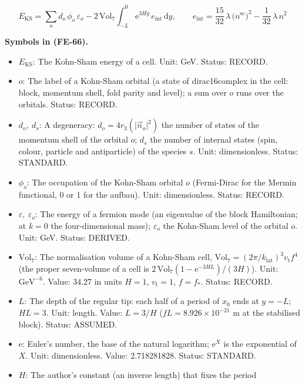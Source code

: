 \documentclass[
  10pt,
]{article}
\providecommand{\tightlist}{%
  \setlength{\itemsep}{0pt}\setlength{\parskip}{0pt}}
\begin{document}
\[
E_{\mathrm{KS}} = \sum_o d_o\,\phi_o\,\varepsilon_o -
 2\,\mathrm{Vol}_7\int_{-L}^{0}\mathrm{e}^{3Hy}\,e_{\mathrm{int}}\,\mathrm{d}y,
\qquad e_{\mathrm{int}} = \frac{15}{32}\,\lambda\,\big(n^{\mathrm{sc}}\big)^2 -
 \frac{1}{32}\,\lambda\,n^2 \tag{FE-66}
\]

\textbf{Symbols in (FE-66).}

\begin{itemize}
\tightlist
\item
  \(E_{\mathrm{KS}}\): The Kohn-Sham energy of a cell. Unit: GeV.
  Status: RECORD.
\item
  \(o\): The label of a Kohn-Sham orbital (a state of dirac16complex in
  the cell: block, momentum shell, fold parity and level); a sum over
  \(o\) runs over the orbitals. Status: RECORD.
\item
  \(d_o,\ d_s\): A degeneracy: \(d_o = 4r_3(\lvert\vec n_o\rvert^2)\)
  the number of states of the momentum shell of the orbital \(o\);
  \(d_s\) the number of internal states (spin, colour, particle and
  antiparticle) of the species \(s\). Unit: dimensionless. Status:
  STANDARD.
\item
  \(\phi_o\): The occupation of the Kohn-Sham orbital \(o\) (Fermi-Dirac
  for the Mermin functional, 0 or 1 for the aufbau). Unit:
  dimensionless. Status: RECORD.
\item
  \(\varepsilon,\ \varepsilon_o\): The energy of a fermion mode (an
  eigenvalue of the block Hamiltonian; at \(k = 0\) the four-dimensional
  mass); \(\varepsilon_o\) the Kohn-Sham level of the orbital \(o\).
  Unit: GeV. Status: DERIVED.
\item
  \(\mathrm{Vol}_7\): The normalisation volume of a Kohn-Sham cell,
  \(\mathrm{Vol}_7 = (2\pi/k_{\mathrm{lat}})^3v_{\mathrm{t}}f^4\) (the
  proper seven-volume of a cell is
  \(2\,\mathrm{Vol}_7(1 - \mathrm{e}^{-3HL})/(3H)\)). Unit:
  \(\mathrm{GeV}^{-6}\). Value: 34.27 in units \(H = 1\),
  \(v_{\mathrm{t}} = 1\), \(f = f_*\). Status: RECORD.
\item
  \(L\): The depth of the regular tip: each half of a period of \(x_0\)
  ends at \(y = -L\); \(HL = 3\). Unit: length. Value: \(L = 3/H\)
  (\(fL = 8.926\times10^{-21}\) m at the stabilised block). Status:
  ASSUMED.
\item
  \(\mathrm{e}\): Euler's number, the base of the natural logarithm;
  \(\mathrm{e}^{X}\) is the exponential of \(X\). Unit: dimensionless.
  Value: 2.718281828. Status: STANDARD.
\item
  \(H\): The author's constant (an inverse length) that fixes the period

\end{itemize}
\end{document}
